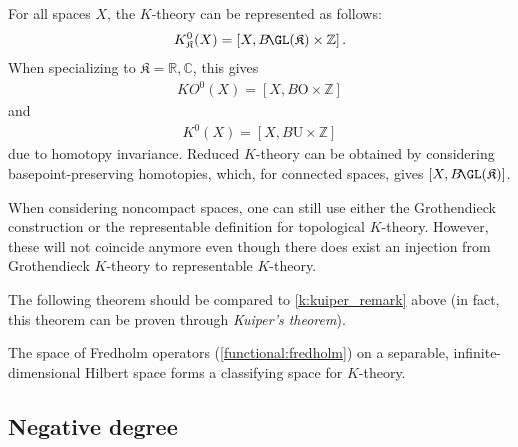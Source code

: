     \begin{property}
        For all spaces $X$, the $K$-theory can be represented as follows:
        \begin{gather}
            K^0_{\mathfrak{K}}(X) = [X,B\!\GL(\mathfrak{K})\times\mathbb{Z}]\,.
        \end{gather}
        When specializing to $\mathfrak{K}=\mathbb{R},\mathbb{C}$, this gives
        \begin{gather}
            KO^0(X) = [X,B\mathrm{O}\times\mathbb{Z}]
        \end{gather}
        and
        \begin{gather}
            K^0(X) = [X,B\mathrm{U}\times\mathbb{Z}]
        \end{gather}
        due to homotopy invariance. Reduced $K$-theory can be obtained by considering basepoint-preserving homotopies, which, for connected spaces, gives $[X,B\!\GL(\mathfrak{K})]$.
    \end{property}

    \begin{remark}
        When considering noncompact spaces, one can still use either the Grothendieck construction or the representable definition for topological $K$-theory. However, these will not coincide anymore even though there does exist an injection from Grothendieck $K$-theory to representable $K$-theory.
    \end{remark}

    The following theorem should be compared to \cref{k:kuiper_remark} above (in fact, this theorem can be proven through \textit{Kuiper's theorem}).
    \begin{theorem}\label{k:atiyah_janich}
        The space of Fredholm operators (\cref{functional:fredholm}) on a separable, infinite-dimensional Hilbert space forms a classifying space for $K$-theory.
    \end{theorem}

\subsection{Negative degree}

